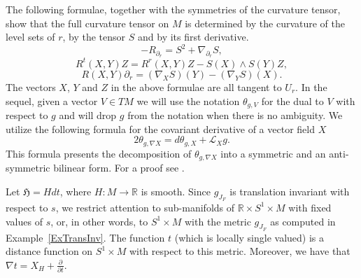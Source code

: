 \documentclass[11pt]{amsart}
\newcommand{\R}{\mathbb{R}}
\theoremstyle{definition}
\theoremstyle{remark}
\begin{document}
The following formulae, together with the symmetries of the curvature tensor, show that the full curvature tensor on $M$ is determined by the curvature of the level sets of $r$, by the tensor $S$ and by its first derivative.
\begin{equation}\label{eqRiem1}
-R_{\partial_r}=S^2+\nabla_{\partial_r} S,
\end{equation}
\begin{equation}\label{eqRiem2}
R^t(X,Y)Z=R^r(X,Y)Z-S(X)\wedge S(Y)Z,
\end{equation}
\begin{equation}\label{eqRiem3}
R(X,Y)\partial_r=(\nabla_XS)(Y)-(\nabla_YS)(X).
\end{equation}
The vectors $X$, $Y$ and $Z$ in the above formulae are all tangent to $U_r$. In the sequel, given a vector $V\in TM$  we will use the notation $\theta_{g,V}$ for the dual to $V$ with respect to $g$ and will drop $g$ from the notation when there is no ambiguity. We utilize the following formula for the covariant derivative of a vector field $X$
\begin{equation}\label{eqCovDer}
2\theta_{g,\nabla X}=d\theta_{g,X}+\mathcal{L}_Xg.
\end{equation}
This formula presents the decomposition of $\theta_{g,\nabla X}$ into a symmetric and an anti-symmetric bilinear form. For a proof see \cite{pe}.

Let $\mathfrak{H}=Hdt$, where $H:M\to\R$ is smooth. Since $g_{J_F}$ is translation invariant with respect to $s$, we restrict attention to sub-manifolds of $\R\times S^1\times M$ with fixed values of $s$, or, in other words, to $S^1\times M$ with the metric $g_{J_F}$ as computed in Example~\ref{ExTransInv}. The function $t$ (which is locally single valued) is a distance function on $S^1\times M$ with respect to this metric. Moreover, we have that $\nabla t=X_H+\frac{\partial}{\partial t}$.
\end{document}

